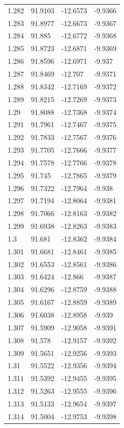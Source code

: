 \begin{tabular}{llll}
1.282 & 91.9103 & -12.6573 & -9.9366 \\
1.283 & 91.8977 & -12.6673 & -9.9367 \\
1.284 & 91.885 & -12.6772 & -9.9368 \\
1.285 & 91.8723 & -12.6871 & -9.9369 \\
1.286 & 91.8596 & -12.6971 & -9.937 \\
1.287 & 91.8469 & -12.707 & -9.9371 \\
1.288 & 91.8342 & -12.7169 & -9.9372 \\
1.289 & 91.8215 & -12.7269 & -9.9373 \\
1.29 & 91.8088 & -12.7368 & -9.9374 \\
1.291 & 91.7961 & -12.7467 & -9.9375 \\
1.292 & 91.7833 & -12.7567 & -9.9376 \\
1.293 & 91.7705 & -12.7666 & -9.9377 \\
1.294 & 91.7578 & -12.7766 & -9.9378 \\
1.295 & 91.745 & -12.7865 & -9.9379 \\
1.296 & 91.7322 & -12.7964 & -9.938 \\
1.297 & 91.7194 & -12.8064 & -9.9381 \\
1.298 & 91.7066 & -12.8163 & -9.9382 \\
1.299 & 91.6938 & -12.8263 & -9.9383 \\
1.3 & 91.681 & -12.8362 & -9.9384 \\
1.301 & 91.6681 & -12.8461 & -9.9385 \\
1.302 & 91.6553 & -12.8561 & -9.9386 \\
1.303 & 91.6424 & -12.866 & -9.9387 \\
1.304 & 91.6296 & -12.8759 & -9.9388 \\
1.305 & 91.6167 & -12.8859 & -9.9389 \\
1.306 & 91.6038 & -12.8958 & -9.939 \\
1.307 & 91.5909 & -12.9058 & -9.9391 \\
1.308 & 91.578 & -12.9157 & -9.9392 \\
1.309 & 91.5651 & -12.9256 & -9.9393 \\
1.31 & 91.5522 & -12.9356 & -9.9394 \\
1.311 & 91.5392 & -12.9455 & -9.9395 \\
1.312 & 91.5263 & -12.9555 & -9.9396 \\
1.313 & 91.5133 & -12.9654 & -9.9397 \\
1.314 & 91.5004 & -12.9753 & -9.9398 \\

\end{tabular}
